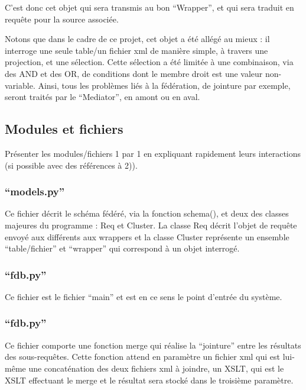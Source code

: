 C’est donc cet objet qui sera transmis au bon “Wrapper”, et qui sera traduit en requête pour la source associée.

Notons que dans le cadre de ce projet, cet objet a été allégé au mieux : il interroge une seule table/un fichier xml de manière simple, à travers une projection, et une sélection. Cette sélection a été limitée à une combinaison, via des AND et des OR, de conditions dont le membre droit est une valeur non-variable. Ainsi, tous les problèmes liés à la fédération, de jointure par exemple, seront traités par le “Mediator”, en amont ou en aval.

\subsection{Modules et fichiers}

Présenter les modules/fichiers 1 par 1 en expliquant rapidement leurs interactions (si possible avec des références à 2)).

\subsubsection{“models.py”}

Ce fichier décrit le schéma fédéré, via la fonction schema(), et deux des classes majeures du programme : Req et Cluster. La classe Req décrit l’objet de requête envoyé aux différents aux wrappers et la classe Cluster représente un ensemble “table/fichier” et “wrapper” qui correspond à un objet interrogé.

\subsubsection{“fdb.py”}

Ce fichier est le fichier “main” et est en ce sens le point d’entrée du système.

\subsubsection{“fdb.py”}

Ce fichier comporte une fonction merge qui réalise la “jointure” entre les résultats des sous-requêtes. Cette fonction attend en paramètre un fichier xml qui est lui-même une concaténation des deux fichiers xml à joindre, un XSLT, qui est le XSLT effectuant le merge et le résultat sera stocké dans le troisième paramètre.